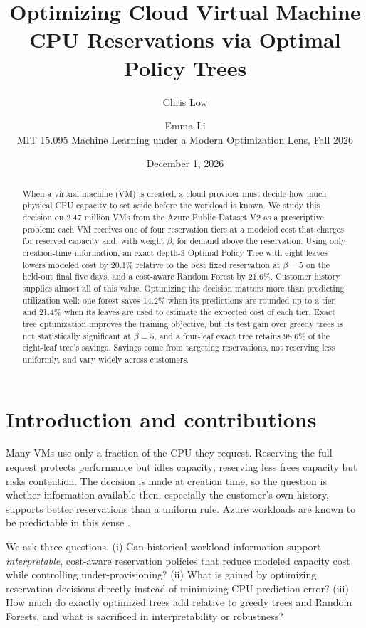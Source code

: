 \documentclass[10pt]{article}
\title{\vspace{-1.5em}Optimizing Cloud Virtual Machine CPU Reservations via Optimal Policy Trees}
\author{Chris Low \and Emma Li\\[1pt] \small MIT 15.095 Machine Learning under a Modern Optimization Lens, Fall 2026}
\date{\small December 1, 2026}
\begin{document}
\maketitle
\vspace{-1.8em}

\begin{abstract}
\noindent When a virtual machine (VM) is created, a cloud provider must decide how much physical CPU capacity to set aside before the workload is known. We study this decision on 2.47 million VMs from the Azure Public Dataset V2 as a prescriptive problem: each VM receives one of four reservation tiers at a modeled cost that charges for reserved capacity and, with weight $\beta$, for demand above the reservation. Using only creation-time information, an exact depth-3 Optimal Policy Tree with eight leaves lowers modeled cost by 20.1\% relative to the best fixed reservation at $\beta=5$ on the held-out final five days, and a cost-aware Random Forest by 21.6\%. Customer history supplies almost all of this value. Optimizing the decision matters more than predicting utilization well: one forest saves 14.2\% when its predictions are rounded up to a tier and 21.4\% when its leaves are used to estimate the expected cost of each tier. Exact tree optimization improves the training objective, but its test gain over greedy trees is not statistically significant at $\beta=5$, and a four-leaf exact tree retains 98.6\% of the eight-leaf tree's savings. Savings come from targeting reservations, not reserving less uniformly, and vary widely across customers.
\end{abstract}

\section{Introduction and contributions}
\label{sec:intro}

Many VMs use only a fraction of the CPU they request. Reserving the full request protects performance but idles capacity; reserving less frees capacity but risks contention. The decision is made at creation time, so the question is whether information available then, especially the customer's own history, supports better reservations than a uniform rule. Azure workloads are known to be predictable in this sense \citep{cortez2017resource}.

We ask three questions. (i) Can historical workload information support \emph{interpretable}, cost-aware reservation policies that reduce modeled capacity cost while controlling under-provisioning? (ii) What is gained by optimizing reservation decisions directly instead of minimizing CPU prediction error? (iii) How much do exactly optimized trees add relative to greedy trees and Random Forests, and what is sacrificed in interpretability or robustness?
\end{document}
